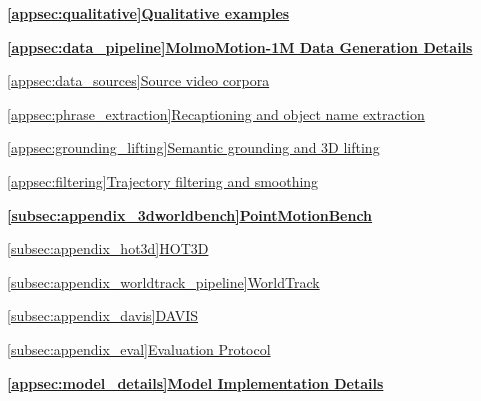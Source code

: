 \documentclass{llmxive}
\providecommand{\benchmarkname}{PointMotionBench\xspace}
\begin{document}
{


\hyperref[appsec:qualitative]{\textbf{\ref*{appsec:qualitative}\quad Qualitative examples}}\dotfill\pageref{appsec:qualitative}


\hyperref[appsec:data_pipeline]{\textbf{\ref*{appsec:data_pipeline}\quad MolmoMotion-1M Data Generation Details}}\dotfill\pageref{appsec:data_pipeline}

\hspace*{2em}\hyperref[appsec:data_sources]{\ref*{appsec:data_sources}\quad Source video corpora}\dotfill\pageref{appsec:data_sources}

\hspace*{2em}\hyperref[appsec:phrase_extraction]{\ref*{appsec:phrase_extraction}\quad Recaptioning and object name extraction}\dotfill\pageref{appsec:phrase_extraction}

\hspace*{2em}\hyperref[appsec:grounding_lifting]{\ref*{appsec:grounding_lifting}\quad Semantic grounding and 3D lifting}\dotfill\pageref{appsec:grounding_lifting}

\hspace*{2em}\hyperref[appsec:filtering]{\ref*{appsec:filtering}\quad Trajectory filtering and smoothing}\dotfill\pageref{appsec:filtering}

\hyperref[subsec:appendix_3dworldbench]{\textbf{\ref*{subsec:appendix_3dworldbench}\quad \benchmarkname{}}}\dotfill\pageref{subsec:appendix_3dworldbench}

\hspace*{2em}\hyperref[subsec:appendix_hot3d]{\ref*{subsec:appendix_hot3d}\quad HOT3D}\dotfill\pageref{subsec:appendix_hot3d}

\hspace*{2em}\hyperref[subsec:appendix_worldtrack_pipeline]{\ref*{subsec:appendix_worldtrack_pipeline}\quad WorldTrack}\dotfill\pageref{subsec:appendix_worldtrack_pipeline}

\hspace*{2em}\hyperref[subsec:appendix_davis]{\ref*{subsec:appendix_davis}\quad DAVIS}\dotfill\pageref{subsec:appendix_davis}

\hspace*{2em}\hyperref[subsec:appendix_eval]{\ref*{subsec:appendix_eval}\quad Evaluation Protocol}\dotfill\pageref{subsec:appendix_eval}

\hyperref[appsec:model_details]{\textbf{\ref*{appsec:model_details}\quad Model Implementation Details}}\dotfill\pageref{appsec:model_details}

}
\end{document}
